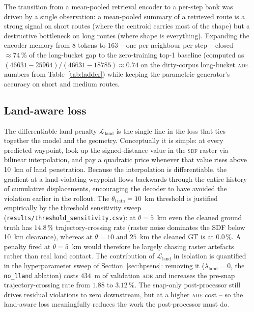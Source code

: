 \documentclass[oneside, a4paper, onecolumn, 11pt]{article}
\newcommand{\ade}{\textsc{ade}}
\newcommand{\sdf}{\textsc{sdf}}
\begin{document}
The transition from a mean-pooled retrieval encoder to a per-step bank
was driven by a single observation: a mean-pooled summary of a
retrieved route is a strong signal on short routes (where the centroid
carries most of the shape) but a destructive bottleneck on long routes
(where shape is everything).  Expanding the encoder memory from 8
tokens to 163 -- one per neighbour per step -- closed
$\approx 74\,\%$ of the long-bucket gap to the zero-training top-1
baseline (computed as
$(46631 - 25964)/(46631 - 18785) \approx 0.74$ on the dirty-corpus
long-bucket \ade{} numbers from Table~\ref{tab:ladder}) while keeping
the parametric generator's accuracy on short and medium routes.

\subsection{Land-aware loss}\label{sec:landloss}

The differentiable land penalty $\mathcal{L}_{\mathrm{land}}$ is the
single line in the loss that ties together the model and the geometry.
Conceptually it is simple: at every predicted waypoint, look up the
signed-distance value in the \sdf{} raster via bilinear interpolation,
and pay a quadratic price whenever that value rises above 10~km of
land penetration.  Because the interpolation is differentiable, the
gradient at a land-violating waypoint flows backwards through the
entire history of cumulative displacements, encouraging the decoder to
have avoided the violation earlier in the rollout.  The
$\theta_{\mathrm{train}} = 10$~km threshold is justified empirically
by the threshold sensitivity sweep
(\texttt{results/threshold\_sensitivity.csv}): at $\theta = 5$~km even
the cleaned ground truth has $14.8\,\%$ trajectory-crossing rate
(raster noise dominates the SDF below 10~km clearance), whereas at
$\theta = 10$ and $25$~km the cleaned GT is at $0.0\,\%$. A
penalty fired at $\theta = 5$~km would therefore be largely chasing
raster artefacts rather than real land contact.
The contribution of $\mathcal{L}_{\mathrm{land}}$ in isolation is
quantified in the hyperparameter sweep of Section~\ref{sec:hpsens}:
removing it ($\lambda_{\mathrm{land}} = 0$, the \texttt{no\_lland}
ablation) costs $434$~m of validation \ade{} and increases the
pre-snap trajectory-crossing rate from $1.88$ to $3.12\,\%$.  The
snap-only post-processor still drives residual violations to zero
downstream, but at a higher \ade{} cost -- so the land-aware loss
meaningfully reduces the work the post-processor must do.
\end{document}
